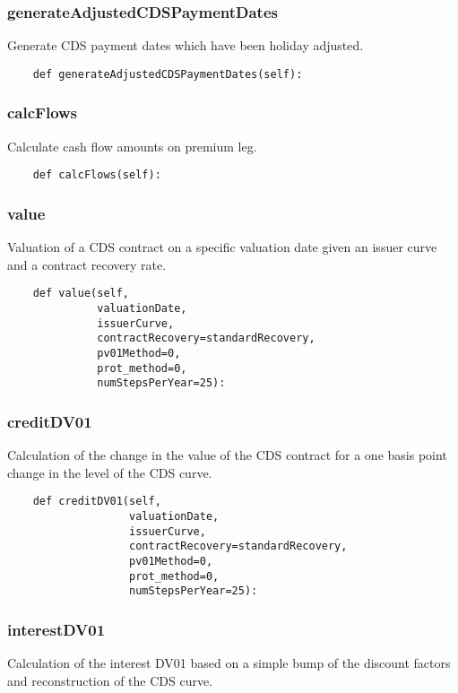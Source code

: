 \documentclass[twoside,11pt]{book}
\begin{document}
\subsubsection*{{\bf generateAdjustedCDSPaymentDates}}
Generate CDS payment dates which have been holiday adjusted. 

\begin{lstlisting}
    def generateAdjustedCDSPaymentDates(self):
\end{lstlisting}

\subsubsection*{{\bf calcFlows}}
Calculate cash flow amounts on premium leg.  

\begin{lstlisting}
    def calcFlows(self):
\end{lstlisting}

\subsubsection*{{\bf value}}
Valuation of a CDS contract on a specific valuation date given an issuer curve and a contract recovery rate. 

\begin{lstlisting}
    def value(self,
              valuationDate,
              issuerCurve,
              contractRecovery=standardRecovery,
              pv01Method=0,
              prot_method=0,
              numStepsPerYear=25):
\end{lstlisting}

\subsubsection*{{\bf creditDV01}}
Calculation of the change in the value of the CDS contract for a one basis point change in the level of the CDS curve. 

\begin{lstlisting}
    def creditDV01(self,
                   valuationDate,
                   issuerCurve,
                   contractRecovery=standardRecovery,
                   pv01Method=0,
                   prot_method=0,
                   numStepsPerYear=25):
\end{lstlisting}

\subsubsection*{{\bf interestDV01}}
Calculation of the interest DV01 based on a simple bump of the discount factors and reconstruction of the CDS curve.  
\end{document}
